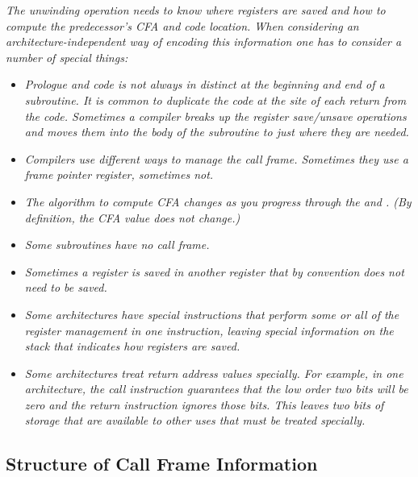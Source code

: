 \textit{The unwinding operation needs to know where registers are
saved and how to compute the predecessor\textquoteright s CFA and code
location. When considering an architecture-independent way
of encoding this information one has to consider a number of
special things:}

\begin{itemize} %

\item \textit{Prologue 
and 
 code is not always in 
distinct 
at the beginning and end of a subroutine. It is common
to duplicate the  code 
at the site of each return
from the code. Sometimes a compiler breaks up the register
save/unsave operations and moves them into the body of the
subroutine to just where they are needed.}


\item \textit{Compilers use different ways to manage the call
frame. Sometimes they use a frame pointer register, sometimes
not.}

\item \textit{The algorithm to compute CFA changes as you progress through
the  
and . 
(By definition, the CFA value
does not change.)}

\item \textit{Some subroutines have no call frame.}

\item \textit{Sometimes a register is saved in another register that by
convention does not need to be saved.}

\item \textit{Some architectures have special instructions that perform
some or all of the register management in one instruction,
leaving special information on the stack that indicates how
registers are saved.}

\item \textit{Some architectures treat return address values specially. For
example, in one architecture, the call instruction guarantees
that the low order two bits will be zero and the return
instruction ignores those bits. This leaves two bits of
storage that are available to other uses that must be treated
specially.}

\end{itemize}


\subsection{Structure of Call Frame Information}
\label{chap:structureofcallframeinformation}

